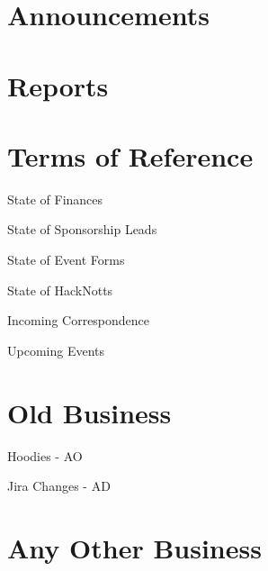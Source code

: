 \documentclass[11pt,hacksoc,agenda]{meetingmins}
\begin{document}
\maketitle

\section{Announcements}

\section{Reports}

\section{Terms of Reference}
\begin{items}
\item {State of Finances}
\item {State of Sponsorship Leads}
\item {State of Event Forms}
\item {State of HackNotts}
\item {Incoming Correspondence}
\item {Upcoming Events}
\end{items}

\section{Old Business}
\begin{items}
\item Hoodies - AO
\item Jira Changes - AD
\end{items}

\section{Any Other Business}

\vspace{1em}
\end{document}
